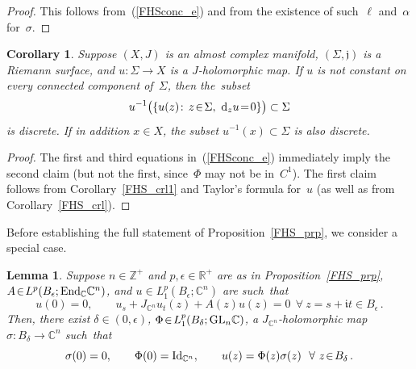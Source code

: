 \documentclass[11pt]{article}
\numberwithin{equation}{section}
\newtheorem{lmm}[thm]{Lemma}
\newtheorem{crl}[thm]{Corollary}
\theoremstyle{definition}
\def\BE#1{\begin{equation}\label{#1}}
\def\EE{\end{equation}}
\def\eref#1{(\ref{#1})}
\def\lra{\longrightarrow}
\def\C{\mathbb{C}}
\def\fI{\mathfrak i}
\def\fj{\mathfrak j}
\def\R{\mathbb R}
\def\Z{{\mathbb Z}}
\def\al{\alpha}
\def\de{\delta}
\def\ep{\epsilon}
\def\si{\sigma}
\def\Si{\Sigma}
\def\End{\textnormal{End}}
\def\GL{\textnormal{GL}}
\def\Id{\textnormal{Id}}
\def\nd{\textnormal{d}}
\begin{document}
\begin{proof}
This follows from~\eref{FHSconc_e}
and from the existence of such~$\ell$ and~$\al$ for~$\si$.
\end{proof}

\begin{crl}\label{FHS_crl2}
Suppose $(X,J)$ is an almost complex manifold, $(\Si,\fj)$ is a Riemann surface,
and $u\!:\Si\!\lra\!X$ is a  $J$-holomorphic map.
If $u$ is not constant on every connected component of~$\Si$, then the~subset 
$$u^{-1}\big(\{u(z)\!:\,z\!\in\!\Si,~\nd_zu\!=\!0\}\big)\subset\Si$$
is discrete. If in addition $x\!\in\!X$, the subset $u^{-1}(x)\!\subset\!\Si$ 
is also discrete.
\end{crl}

\begin{proof}
The first and third equations in~\eref{FHSconc_e} immediately imply the second claim
(but not the first, since~$\Phi$ may not be in~$C^1$).
The first claim follows from Corollary~\ref{FHS_crl1} and Taylor's formula for~$u$
(as well as from Corollary~\ref{FHS_crl}).
\end{proof}


\noindent
Before establishing the full statement of Proposition~\ref{FHS_prp}, 
we consider a special case.

\begin{lmm}\label{FHS_lmm}
Suppose $n\!\in\!\Z^+$ and $p,\ep\!\in\!\R^+$ are as in Proposition~\ref{FHS_prp},
$A\!\in\!L^p(B_{\ep};\End_{\C}\C^n)$, and $u\!\in\!L^p_1(B_{\ep};\C^n)$
are such~that 
\BE{FHScond4_e} u(0)=0, \qquad 
u_s+J_{\C^n}u_t(z)+A(z)u(z)=0 ~~\forall~z\!=\!s\!+\!\fI t\!\in\!B_{\ep}\,.\EE
Then, there exist $\de\!\in\!(0,\ep)$,   $\Phi\!\in\!L_1^p(B_{\de};\GL_n\C)$, 
a $J_{\C^n}$-holomorphic map $\si\!:B_{\de}\!\lra\!\C^n$ such~that 
\BE{FHSconc4_e} \si(0)=0, \qquad
\Phi(0)=\Id_{\C^n}, \qquad u(z)=\Phi(z)\si(z)
~~\forall~z\!\in\!B_{\de}\,.\EE
\end{lmm}
\end{document}
